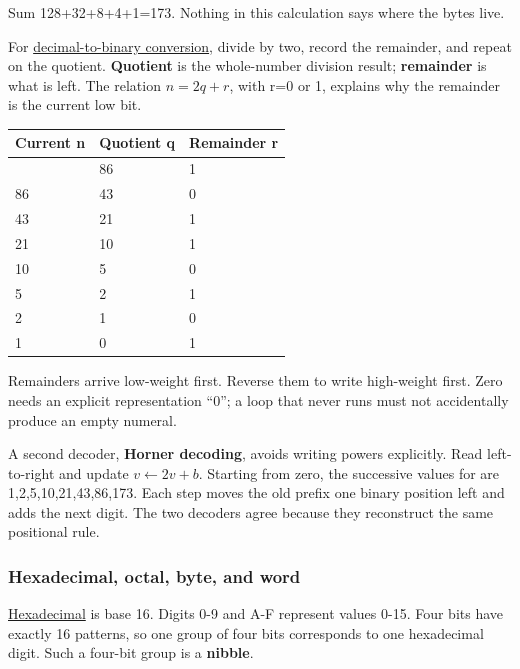 Sum 128+32+8+4+1=173. Nothing in this calculation says where the bytes live.

For \hyperref[appendix-dc552784a2c0]{decimal-to-binary conversion}, divide by two, record the remainder, and repeat on the quotient. \textbf{Quotient} is the whole-number division result; \textbf{remainder} is what is left. The relation \(n=2q+r\), with r=0 or 1, explains why the remainder is the current low bit.

{\def\LTcaptype{none} %
\begin{longtable}[]{@{}lll@{}}
\toprule\noalign{}
Current n & Quotient q & Remainder r \\
\midrule\noalign{}
\endhead
\bottomrule\noalign{}
\endlastfoot
173 & 86 & 1 \\
86 & 43 & 0 \\
43 & 21 & 1 \\
21 & 10 & 1 \\
10 & 5 & 0 \\
5 & 2 & 1 \\
2 & 1 & 0 \\
1 & 0 & 1 \\
\end{longtable}
}

Remainders arrive low-weight first. Reverse them to write  high-weight first. Zero needs an explicit representation ``0''; a loop that never runs must not accidentally produce an empty numeral.

A second decoder, \textbf{Horner decoding}, avoids writing powers explicitly. Read left-to-right and update \(v\leftarrow2v+b\). Starting from zero, the successive values for  are 1,2,5,10,21,43,86,173. Each step moves the old prefix one binary position left and adds the next digit. The two decoders agree because they reconstruct the same positional rule.

\subsubsection{Hexadecimal, octal, byte, and word}\label{01-foundations-i-ch001-hexadecimal-octal-byte-and-word}

\hypertarget{01-foundations-i-ch001-hexadecimal-octal-byte-and-word}{}

\hyperref[appendix-6b8075763724]{Hexadecimal} is base 16. Digits 0-9 and A-F represent values 0-15. Four bits have exactly 16 patterns, so one group of four bits corresponds to one hexadecimal digit. Such a four-bit group is a \textbf{nibble}.

